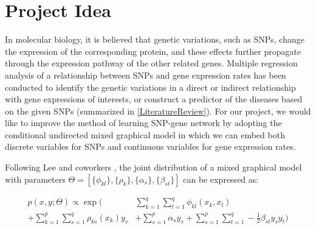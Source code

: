 \documentclass{article}
\begin{document}
 


\section{Project Idea}

In molecular biology, it is believed that genetic variations, such as SNPs, change the expression of the corresponding protein, and these effects further propagate through the expression pathway of the other related genes. Multiple regression analysis of a relationship between SNPs and gene expression rates has been conducted to identify the genetic variations in a direct or indirect relationship with gene expressions of interests, or construct a predictor of the diseases based on the given SNPs (summarized in \ref{LiteratureReview}). For our project, we would like to improve the method of learning SNP-gene network by adopting the conditional undirected mixed graphical model in which we can embed both discrete variables for SNPs and continuous variables for gene expression rates.

Following Lee and coworkers \cite{lee2013structure}, the joint distribution of a mixed graphical model with parameters $\Theta = [\{\phi_{kl}\}, \{\rho_{k}\}, \{\alpha_{s}\}, \{\beta_{st}\}]$ can be expressed as:

\begin{align}
p(x, y ; \Theta) \propto \exp \Big( &\sum_{k=1}^{q} \sum_{l=1}^{q} \phi_{kl} (x_k, x_l) \nonumber \\
+ \sum_{k=1}^{p} \sum_{s=1}^{q} \rho_{ks}(x_k) y_s  &+ \sum_{s=1}^{p} \alpha_s y_s + \sum_{s=1}^{p} \sum_{t=1}^{q} -\frac{1}{2} \beta_{st} y_s y_t \Big)
\end{align} 
\end{document}
